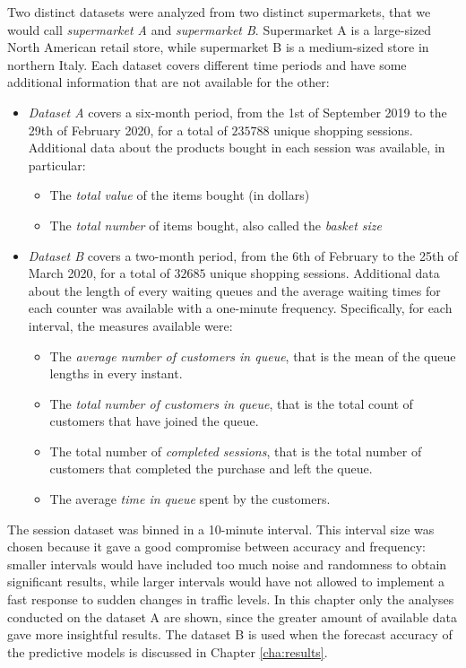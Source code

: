 Two distinct datasets were analyzed from two distinct supermarkets, that we would call \emph{supermarket A} and \emph{supermarket B}. Supermarket A is a large-sized North American retail store, while supermarket B is a medium-sized store in northern Italy. Each dataset covers different time periods and have some additional information that are not available for the other:
\begin{itemize}
  \item \emph{Dataset A} covers a six-month period, from the 1st of September 2019 to the 29th of February 2020, for a total of \( 235788 \) unique shopping sessions. Additional data about the products bought in each session was available, in particular:
        \begin{itemize}
          \item The \emph{total value} of the items bought (in dollars)
          \item The \emph{total number} of items bought, also called the \emph{basket size}
        \end{itemize}
  \item \emph{Dataset B} covers a two-month period, from the 6th of February to the 25th of March 2020, for a total of \( 32685 \) unique shopping sessions. Additional data about the length of every waiting queues and the average waiting times for each counter was available with a one-minute frequency. Specifically, for each interval, the measures available were:
        \begin{itemize}
          \item The \emph{average number of customers in queue}, that is the mean of the queue lengths in every instant.
          \item The \emph{total number of customers in queue}, that is the total count of customers that have joined the queue.
          \item The total number of \emph{completed sessions}, that is the total number of customers that completed the purchase and left the queue.
          \item The average \emph{time in queue} spent by the customers.
        \end{itemize}
\end{itemize}

The session dataset was binned in a 10-minute interval. This interval size was chosen because it gave a good compromise between accuracy and frequency: smaller intervals would have included too much noise and randomness to obtain significant results, while larger intervals would have not allowed to implement a fast response to sudden changes in traffic levels. In this chapter only the analyses conducted on the dataset A are shown, since the greater amount of available data gave more insightful results. The dataset B is used when the forecast accuracy of the predictive models is discussed in Chapter \ref{cha:results}.


